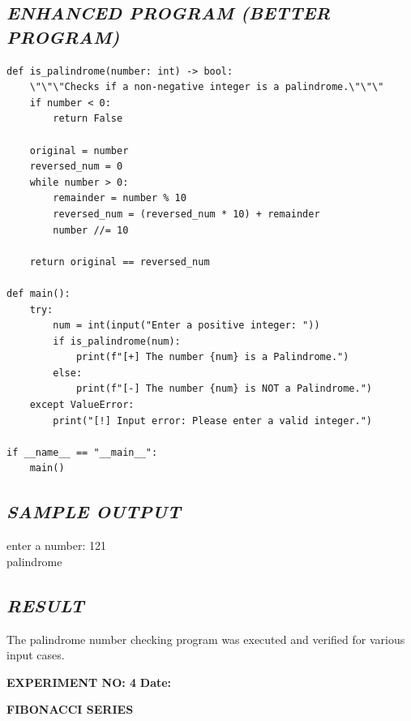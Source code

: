 \documentclass[11pt,a4paper]{article}
\begin{document}
\subsection*{\textit{ENHANCED PROGRAM (BETTER PROGRAM)}}
\begin{lstlisting}[style=pythonstyle]
def is_palindrome(number: int) -> bool:
    \"\"\"Checks if a non-negative integer is a palindrome.\"\"\"
    if number < 0:
        return False
    
    original = number
    reversed_num = 0
    while number > 0:
        remainder = number % 10
        reversed_num = (reversed_num * 10) + remainder
        number //= 10
        
    return original == reversed_num

def main():
    try:
        num = int(input("Enter a positive integer: "))
        if is_palindrome(num):
            print(f"[+] The number {num} is a Palindrome.")
        else:
            print(f"[-] The number {num} is NOT a Palindrome.")
    except ValueError:
        print("[!] Input error: Please enter a valid integer.")

if __name__ == "__main__":
    main()
\end{lstlisting}

\subsection*{\textit{SAMPLE OUTPUT}}
\begin{tcolorbox}[colback=black!85,colframe=navyblue,title=\textbf{Terminal Output},coltitle=white,fonttitle=\bfseries\small]
\small\ttfamily\color{green!30!white}
enter a number: 121\\
palindrome
\end{tcolorbox}

\subsection*{\textit{RESULT}}
The palindrome number checking program was executed and verified for various input cases.

\newpage

\noindent
\textbf{\large EXPERIMENT NO: 4} \hfill \textbf{\large Date: \underline{\hspace{3cm}}}

\vspace{0.2cm}
\begin{center}
{\Huge \textbf{\textcolor{navyblue}{FIBONACCI SERIES}}}
\end{center}
\vspace{0.3cm}
\end{document}
